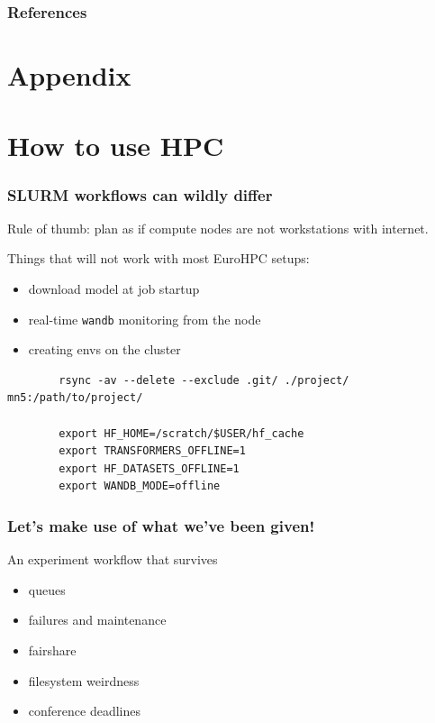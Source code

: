 \documentclass[10pt,aspectratio=169,notheorems]{beamer}
\begin{document}
\begin{frame}[allowframebreaks]
    \frametitle{References}
    
    
\end{frame}

\section*{Appendix}

\section{How to use HPC}

\begin{frame}[fragile]
    \frametitle{SLURM workflows can wildly differ}
    Rule of thumb: plan as if compute nodes are not workstations with internet.

    \vspace{0.4em}
    Things that will not work with most EuroHPC setups:
    \begin{itemize}
        \item download model at job startup
        \item real-time \texttt{wandb} monitoring from the node
        \item creating envs on the cluster
    \end{itemize}

    \begin{verbatim}
        rsync -av --delete --exclude .git/ ./project/ mn5:/path/to/project/

        export HF_HOME=/scratch/$USER/hf_cache
        export TRANSFORMERS_OFFLINE=1
        export HF_DATASETS_OFFLINE=1
        export WANDB_MODE=offline
    \end{verbatim}
\end{frame}


\begin{frame}
    \frametitle{Let's make use of what we've been given!}
    An experiment workflow that survives
    \begin{itemize}
        \item queues
        \item failures and maintenance
        \item fairshare
        \item filesystem weirdness
        \item conference deadlines
    \end{itemize}
\end{frame}
\end{document}
